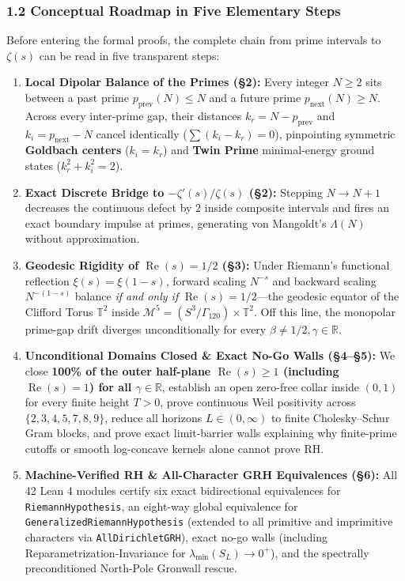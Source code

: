 \documentclass[
  11pt,
]{article}
\providecommand{\tightlist}{%
  \setlength{\itemsep}{0pt}\setlength{\parskip}{0pt}}
\begin{document}
\subsubsection{1.2 Conceptual Roadmap in Five Elementary
Steps}\label{conceptual-roadmap-in-five-elementary-steps}

Before entering the formal proofs, the complete chain from prime
intervals to \(\zeta(s)\) can be read in five transparent steps:

\begin{enumerate}
\def\labelenumi{\arabic{enumi}.}
\tightlist
\item
  \textbf{Local Dipolar Balance of the Primes (§2):} Every integer
  \(N \ge 2\) sits between a past prime \(p_{\text{prev}}(N) \le N\) and
  a future prime \(p_{\text{next}}(N) \ge N\). Across every inter-prime
  gap, their distances \(k_r = N - p_{\text{prev}}\) and
  \(k_i = p_{\text{next}} - N\) cancel identically
  (\(\sum (k_i - k_r) = 0\)), pinpointing symmetric \textbf{Goldbach
  centers} (\(k_i = k_r\)) and \textbf{Twin Prime} minimal-energy ground
  states (\(k_r^2 + k_i^2 = 2\)).
\item
  \textbf{Exact Discrete Bridge to \(-\zeta'(s)/\zeta(s)\) (§2):}
  Stepping \(N \to N + 1\) decreases the continuous defect by \(2\)
  inside composite intervals and fires an exact boundary impulse at
  primes, generating von Mangoldt's \(\Lambda(N)\) without
  approximation.
\item
  \textbf{Geodesic Rigidity of \(\operatorname{Re}(s) = 1/2\) (§3):}
  Under Riemann's functional reflection \(\xi(s) = \xi(1-s)\), forward
  scaling \(N^{-s}\) and backward scaling \(N^{-(1-s)}\) balance
  \emph{if and only if} \(\operatorname{Re}(s) = 1/2\)---the geodesic
  equator of the Clifford Torus \(\mathbb{T}^2\) inside
  \(\mathcal{M}^5 = (S^3/\Gamma_{120}) \times \mathbb{T}^2\). Off this
  line, the monopolar prime-gap drift diverges unconditionally for every
  \(\beta \neq 1/2, \gamma \in \mathbb{R}\).
\item
  \textbf{Unconditional Domains Closed \& Exact No-Go Walls (§4--§5):}
  We close \textbf{100\% of the outer half-plane
  \(\operatorname{Re}(s) \ge 1\) (including \(\operatorname{Re}(s)=1\))
  for all \(\gamma \in \mathbb{R}\)}, establish an open zero-free collar
  inside \((0,1)\) for every finite height \(T > 0\), prove continuous
  Weil positivity across \(\{2,3,4,5,7,8,9\}\), reduce all horizons
  \(L \in (0,\infty)\) to finite Cholesky--Schur Gram blocks, and prove
  exact limit-barrier walls explaining why finite-prime cutoffs or
  smooth log-concave kernels alone cannot prove RH.
\item
  \textbf{Machine-Verified RH \& All-Character GRH Equivalences (§6):}
  All 42 Lean 4 modules certify six exact bidirectional equivalences for
  \texttt{RiemannHypothesis}, an eight-way global equivalence for
  \texttt{GeneralizedRiemannHypothesis} (extended to all primitive and
  imprimitive characters via \texttt{AllDirichletGRH}), exact no-go
  walls (including Reparametrization-Invariance for
  \(\lambda_{\min}(S_L) \to 0^+\)), and the spectrally preconditioned
  North-Pole Gronwall rescue.
\end{enumerate}
\end{document}
